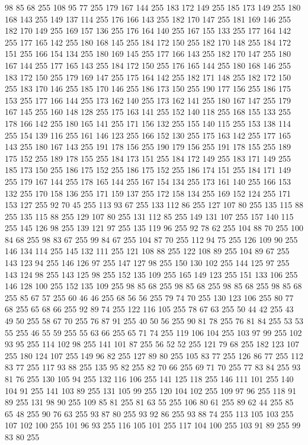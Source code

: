 98 85 68 255 108 95 77 255 179 167 144 255 183 172 149 255 185 173 149 255 180 168 143 255 149 137 114 255 176 166 143 255 182 170 147 255 181 169 146 255 182 170 149 255 169 157 136 255 176 164 140 255 167 155 133 255 177 164 142 255 177 165 142 255 180 168 145 255 184 172 150 255 182 170 148 255 184 172 151 255 166 154 134 255 180 169 145 255 177 166 143 255 182 170 147 255 180 167 144 255 177 165 143 255 184 172 150 255 176 165 144 255 180 168 146 255 183 172 150 255 179 169 147 255 175 164 142 255 182 171 148 255 182 172 150 255 183 170 146 255 185 170 146 255 186 173 150 255 190 177 156 255 186 175 153 255 177 166 144 255 173 162 140 255 173 162 141 255 180 167 147 255 179 167 145 255 160 148 128 255 175 163 141 255 152 140 118 255 168 155 133 255 178 166 142 255 180 165 141 255 171 156 132 255 155 140 115 255 153 138 114 255 154 139 116 255 161 146 123 255 166 152 130 255 175 163 142 255 177 165 143 255 180 167 143 255 191 178 156 255 190 179 156 255 191 178 155 255 189 175 152 255 189 178 155 255
184 173 151 255 184 172 149 255 183 171 149 255 185 173 150 255 186 175 152 255 186 175 152 255 186 174 151 255 184 171 149 255 179 167 144 255 178 165 144 255 167 154 134 255 173 161 140 255 166 153 132 255 170 158 136 255 171 159 137 255 172 158 134 255 169 152 124 255 171 153 127 255 92 70 45 255 113 93 67 255 133 112 86 255 127 107 80 255 135 115 88 255 135 115 88 255 129 107 80 255 131 112 85 255 149 131 107 255 157 140 115 255 145 126 98 255 139 121 97 255 135 119 96 255 92 78 62 255 104 88 70 255 100 84 68 255 98 83 67 255 99 84 67 255 104 87 70 255 112 94 75 255 126 109 90 255 146 134 114 255 145 132 111 255 121 108 88 255 122 108 89 255 104 89 67 255 143 123 94 255 146 126 97 255 147 127 98 255 150 130 102 255 144 125 97 255 143 124 98 255 143 125 98 255 152 135 109 255 165 149 123 255 151 133 106 255 146 128 100 255 152 135 109 255 98 85 68 255 98 85 68 255 98 85 68 255 98 85 68 255 85 67 57 255 60 46 46 255 68 56 56 255 79 74 70 255
130 123 106 255 80 77 68 255 65 68 66 255 92 89 74 255 122 116 105 255 78 67 63 255 50 44 42 255 43 49 50 255 58 67 70 255 76 87 91 255 40 50 56 255 90 81 78 255 76 81 84 255 53 53 55 255 46 55 59 255 55 63 66 255 65 71 74 255 119 106 104 255 103 97 99 255 102 93 95 255 114 102 98 255 141 101 87 255 56 52 52 255 121 79 68 255 182 123 107 255 180 124 107 255 149 96 82 255 127 89 80 255 105 83 77 255 126 86 77 255 112 83 77 255 117 93 88 255 135 95 82 255 82 70 66 255 69 71 70 255 77 83 84 255 93 81 76 255 130 105 94 255 132 116 106 255 141 125 118 255 146 111 101 255 140 104 91 255 141 103 89 255 131 105 99 255 120 104 102 255 109 97 96 255 118 91 89 255 131 98 90 255 109 85 81 255 81 63 55 255 106 80 61 255 89 62 44 255 85 65 48 255 90 76 63 255 93 87 80 255 93 92 86 255 93 88 74 255 113 105 103 255 107 102 100 255 101 96 93 255 116 105 101 255 117 104 100 255 103 91 89 255 99 83 80 255
